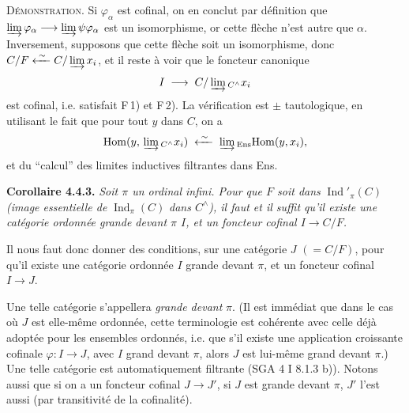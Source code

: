 \documentclass[11pt]{article}
\newcommand{\printedpage}[1]{\if\relax\detokenize{#1}\relax\else\marginpar{\footnotesize p.~#1}\fi}
\newcommand{\msp}[1]{\marginpar{\footnotesize [#1]}}
\newcommand{\Hom}{\mathrm{Hom}}
\newcommand{\Ind}{\operatorname{Ind}}
\begin{document}
\textsc{Démonstration}. Si $\varphi_\alpha$ est cofinal, on en conclut par définition que $\varinjlim \varphi_\alpha \longrightarrow \varinjlim \psi\varphi_\alpha$ est un isomorphisme, or cette flèche n'est autre que $\alpha$. Inversement, supposons que cette flèche soit un isomorphisme, donc $C/F \xleftarrow{\;\sim\;} C/\varinjlim x_i$, et il reste à voir que le foncteur canonique
\[
I \;\longrightarrow\; C/\varinjlim{}_{C^{\wedge}} x_i
\]
est cofinal, i.e. satisfait F\,1) et F\,2). La vérification est $\pm$ tautologique, en utilisant le fait que pour tout $y$ dans $C$, on a
\[
\Hom(y,\, \varinjlim{}_{C^{\wedge}} x_i) \;\xleftarrow{\;\sim\;}\; \varinjlim{}_{\mathrm{Ens}}\Hom(y,x_i),
\]
et du “calcul” des limites inductives filtrantes dans Ens.

\textbf{Corollaire 4.4.3.} \textit{Soit $\pi$ un ordinal infini. Pour que $F$ soit dans} $\Ind'_\pi(C)$ \textit{(image essentielle de} $\Ind_\pi(C)$ \textit{dans $C^{\wedge}$), il faut et il suffit qu'il existe une catégorie ordonnée grande devant $\pi$ $I$, et un foncteur cofinal $I \longrightarrow C/F$.}

Il nous faut donc donner des conditions, sur une catégorie $J$ $(= C/F)$, pour qu'il existe une catégorie ordonnée $I$ grande devant $\pi$, et un foncteur cofinal $I \longrightarrow J$.

\msp{page 81}
Une telle catégorie s'appellera \textit{grande devant} $\pi$. (Il est immédiat que dans le cas où $J$ est elle-même ordonnée, cette terminologie est cohérente avec celle déjà adoptée pour les ensembles ordonnés, i.e. que s'il existe une application croissante cofinale $\varphi : I \longrightarrow J$, avec $I$ grand devant $\pi$, alors $J$ est lui-même grand devant $\pi$.) Une telle catégorie est
\printedpage{17}
automatiquement filtrante (SGA 4 I 8.1.3 b)). Notons aussi que si on a un foncteur cofinal $J \longrightarrow J'$, si $J$ est grande devant $\pi$, $J'$ l'est aussi (par transitivité de la cofinalité).
\end{document}
